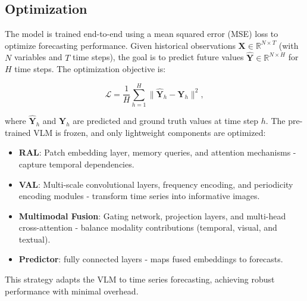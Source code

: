 \subsection{Optimization}

The model is trained end-to-end using a mean squared error (MSE) loss to optimize forecasting performance. Given historical observations \(\mathbf{X} \in \mathbb{R}^{N \times T}\) (with \(N\) variables and \(T\) time steps), the goal is to predict future values \(\hat{\mathbf{Y}} \in \mathbb{R}^{N \times H}\) for \(H\) time steps. The optimization objective is:

\vspace{-1em}
\begin{equation}
    \mathcal{L} = \frac{1}{H} \sum_{h=1}^{H} \| \hat{\mathbf{Y}}_h - \mathbf{Y}_h \|^2,
\end{equation}
\vspace{-1em}

where \(\hat{\mathbf{Y}}_h\) and \(\mathbf{Y}_h\) are predicted and ground truth values at time step \(h\). The pre-trained VLM is frozen, and only lightweight components are optimized:

\vspace{-1em}
\begin{itemize}[leftmargin=*, itemsep=0pt]
    \item \textbf{RAL}: Patch embedding layer, memory queries, and attention mechanisms - capture temporal dependencies.
    \item \textbf{VAL}: Multi-scale convolutional layers, frequency encoding, and periodicity encoding modules - transform time series into informative images.
    \item \textbf{Multimodal Fusion}: Gating network, projection layers, and multi-head cross-attention - balance modality contributions (temporal, visual, and textual).
    \item \textbf{Predictor}: fully connected layers - maps fused embeddings to forecasts. 
\end{itemize}
\vspace{-1em}

This strategy adapts the VLM to time series forecasting, achieving robust performance with minimal overhead.